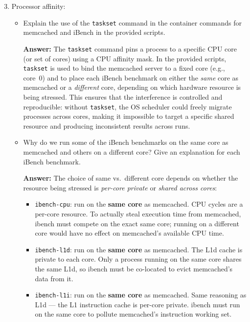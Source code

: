 \begin{enumerate}[label=(\alph*)]
    \setcounter{enumi}{2}
    \item Processor affinity:
    \begin{itemize}
        \item Explain the use of the \texttt{taskset} command in the container commands for memcached and iBench in the provided scripts.
        
        \textbf{Answer:} %
        The \texttt{taskset} command pins a process to a specific CPU core (or set of
        cores) using a CPU affinity mask. In the provided scripts, \texttt{taskset} is
        used to bind the memcached server to a fixed core (e.g., core~0) and to place
        each iBench benchmark on either the \emph{same} core as memcached or a
        \emph{different} core, depending on which hardware resource is being stressed.
        This ensures that the interference is controlled and reproducible: without
        \texttt{taskset}, the OS scheduler could freely migrate processes across cores,
        making it impossible to target a specific shared resource and producing
        inconsistent results across runs.

        \item Why do we run some of the iBench benchmarks on the same core as memcached and others on a different core? Give an explanation for each iBench benchmark.

        \textbf{Answer:} 
        The choice of same vs.\ different core depends on whether the resource being
        stressed is \emph{per-core private} or \emph{shared across cores}:

        \begin{itemize}
            \item \texttt{ibench-cpu}: run on the \textbf{same core} as memcached.
            CPU cycles are a per-core resource. To actually steal execution time from
            memcached, ibench must compete on the exact same core; running on a
            different core would have no effect on memcached's available CPU time.

            \item \texttt{ibench-l1d}: run on the \textbf{same core} as memcached.
            The L1d cache is private to each core. Only a process running on the same
            core shares the same L1d, so ibench must be co-located to evict
            memcached's data from it.

            \item \texttt{ibench-l1i}: run on the \textbf{same core} as memcached.
            Same reasoning as L1d — the L1 instruction cache is per-core private.
            ibench must run on the same core to pollute memcached's instruction
            working set.


\end{itemize}
\end{itemize}
\end{enumerate}
